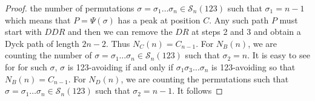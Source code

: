 \documentclass[
final,nomarks
]{dmtcs-episciences}
\newcommand{\Sn}[1]{\mathcal{S}_{#1}}
\begin{document}
\begin{proof}
	the number of permutations \begin{math}\sigma = \sigma_1 \ldots \sigma_n \in \Sn{n}(123)\end{math} such that 
	\begin{math}\sigma_1 =n-1\end{math} which means that \begin{math}P=\Psi(\sigma)\end{math} has a peak at position \begin{math}C\end{math}. Any such path 
	\begin{math}P\end{math} must start with \begin{math}DDR\end{math} and then we can remove the \begin{math}DR\end{math} at steps 2 and 3 and 
	obtain a Dyck path of length \begin{math}2n-2\end{math}. Thus \begin{math}N_{C}(n)=C_{n-1}\end{math}. For \begin{math}N_B(n)\end{math}, we are counting 
	the number of \begin{math}\sigma = \sigma_1 \ldots \sigma_n \in \Sn{n}(123)\end{math} such that \begin{math}\sigma_2 =n\end{math}.  It is easy to 
	see for for such \begin{math}\sigma\end{math}, \begin{math}\sigma\end{math} is 123-avoiding if and only if \begin{math}\sigma_1\sigma_3 \ldots \sigma_n\end{math} is 
	123-avoiding so that \begin{math}N_B(n) = C_{n-1}\end{math}. For \begin{math}N_D(n)\end{math}, we are counting the permutations 
	such that \begin{math}\sigma = \sigma_1 \ldots \sigma_n \in \Sn{n}(123)\end{math} such that \begin{math}\sigma_{2} = n-1\end{math}.  It follows 

\end{proof}
\end{document}

